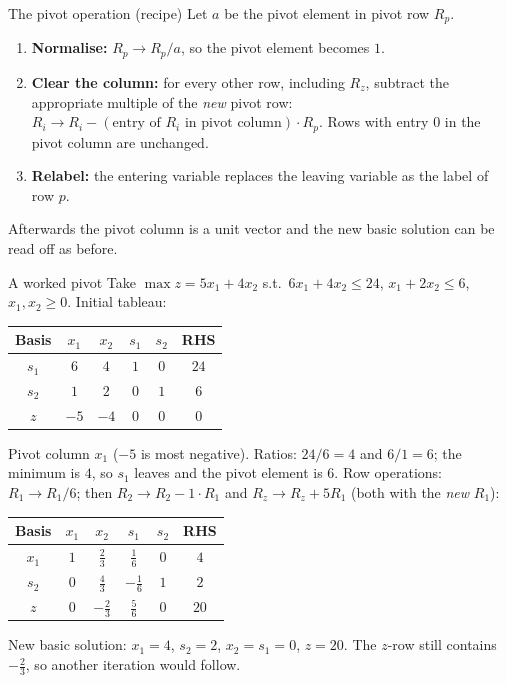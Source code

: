 \begin{rulebox}{The pivot operation (recipe)}
Let $a$ be the pivot element in pivot row $R_p$.
\begin{enumerate}[leftmargin=1.8em,itemsep=0.3ex]
  \item \textbf{Normalise:} $R_p\to R_p/a$, so the pivot element becomes
        $1$.
  \item \textbf{Clear the column:} for every other row, including $R_z$,
        subtract the appropriate multiple of the \emph{new} pivot row:
        $R_i\to R_i-(\text{entry of }R_i\text{ in pivot column})\cdot R_p$.
        Rows with entry $0$ in the pivot column are unchanged.
  \item \textbf{Relabel:} the entering variable replaces the leaving
        variable as the label of row $p$.
\end{enumerate}
Afterwards the pivot column is a unit vector and the new basic solution can
be read off as before.
\end{rulebox}

\begin{rulebox}{A worked pivot}
Take $\max z=5x_1+4x_2$ s.t.\ $6x_1+4x_2\le 24$, $x_1+2x_2\le 6$,
$x_1,x_2\ge 0$. Initial tableau:
\begin{center}
\begin{tabular}{c|cccc|c}
Basis & $x_1$ & $x_2$ & $s_1$ & $s_2$ & RHS\\
\hline
$s_1$ & $6$ & $4$ & $1$ & $0$ & $24$\\
$s_2$ & $1$ & $2$ & $0$ & $1$ & $6$\\
\hline
$z$ & $-5$ & $-4$ & $0$ & $0$ & $0$\\
\end{tabular}
\end{center}
Pivot column $x_1$ ($-5$ is most negative). Ratios: $24/6=4$ and $6/1=6$;
the minimum is $4$, so $s_1$ leaves and the pivot element is $6$.
Row operations: $R_1\to R_1/6$; then $R_2\to R_2-1\cdot R_1$ and
$R_z\to R_z+5R_1$ (both with the \emph{new} $R_1$):
\begin{center}
\begin{tabular}{c|cccc|c}
Basis & $x_1$ & $x_2$ & $s_1$ & $s_2$ & RHS\\
\hline
$x_1$ & $1$ & $\tfrac{2}{3}$ & $\tfrac{1}{6}$ & $0$ & $4$\\
$s_2$ & $0$ & $\tfrac{4}{3}$ & $-\tfrac{1}{6}$ & $1$ & $2$\\
\hline
$z$ & $0$ & $-\tfrac{2}{3}$ & $\tfrac{5}{6}$ & $0$ & $20$\\
\end{tabular}
\end{center}
New basic solution: $x_1=4$, $s_2=2$, $x_2=s_1=0$, $z=20$. The $z$-row
still contains $-\tfrac{2}{3}$, so another iteration would follow.
\end{rulebox}

